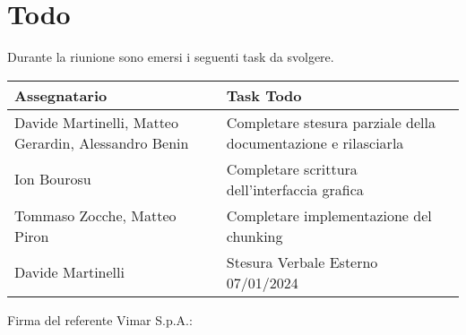 \section{Todo}
Durante la riunione sono emersi i seguenti task da svolgere.

\begin{center}
  \begin{tabular}{|p{5cm}|p{8cm}|}
    \hline
    \textbf{Assegnatario}       & \textbf{Task Todo} \\ \hline
        Davide Martinelli, Matteo Gerardin, Alessandro Benin & Completare stesura parziale della documentazione e rilasciarla \\ \hline
        Ion Bourosu & Completare scrittura dell'interfaccia grafica \\ \hline
        Tommaso Zocche, Matteo Piron & Completare implementazione del chunking \\ \hline
        Davide Martinelli & Stesura Verbale Esterno 07/01/2024 \\ \hline
  \end{tabular}
\end{center}

\vspace{4cm}
\noindent Firma del referente Vimar S.p.A.: \underline{\hspace{5cm}}
